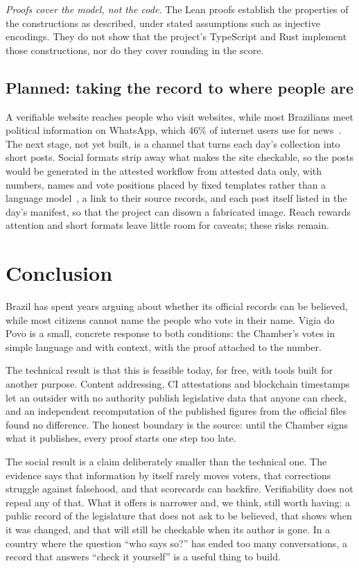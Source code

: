 \emph{Proofs cover the model, not the code.} The Lean proofs establish the properties of the constructions as described, under stated assumptions such as injective encodings. They do not show that the project's TypeScript and Rust implement those constructions, nor do they cover rounding in the score.

\subsection{Planned: taking the record to where people are}
\label{sec:future-social}

A verifiable website reaches people who visit websites, while most Brazilians meet political information on WhatsApp, which 46\% of internet users use for news~\citep{carro2026brazil}. The next stage, not yet built, is a channel that turns each day's collection into short posts. Social formats strip away what makes the site checkable, so the posts would be generated in the attested workflow from attested data only, with numbers, names and vote positions placed by fixed templates rather than a language model~\citep{tse2026res23755}, a link to their source records, and each post itself listed in the day's manifest, so that the project can disown a fabricated image. Reach rewards attention and short formats leave little room for caveats; these risks remain.

\section{Conclusion}
\label{sec:conclusion}

Brazil has spent years arguing about whether its official records can be believed, while most citizens cannot name the people who vote in their name. Vigia do Povo is a small, concrete response to both conditions: the Chamber's votes in simple language and with context, with the proof attached to the number.

The technical result is that this is feasible today, for free, with tools built for another purpose. Content addressing, CI attestations and blockchain timestamps let an outsider with no authority publish legislative data that anyone can check, and an independent recomputation of the published figures from the official files found no difference. The honest boundary is the source: until the Chamber signs what it publishes, every proof starts one step too late.

The social result is a claim deliberately smaller than the technical one. The evidence says that information by itself rarely moves voters, that corrections struggle against falsehood, and that scorecards can backfire. Verifiability does not repeal any of that. What it offers is narrower and, we think, still worth having: a public record of the legislature that does not ask to be believed, that shows when it was changed, and that will still be checkable when its author is gone. In a country where the question ``who says so?'' has ended too many conversations, a record that answers ``check it yourself'' is a useful thing to build.

